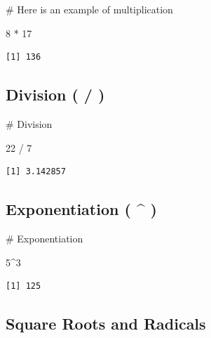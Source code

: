 \documentclass[
  letterpaper,
  DIV=11,
  numbers=noendperiod]{scrreprt}
\newenvironment{Shaded}{\begin{snugshade}}{\end{snugshade}}
\newcommand{\CommentTok}[1]{\textcolor[rgb]{0.37,0.37,0.37}{#1}}
\newcommand{\DecValTok}[1]{\textcolor[rgb]{0.68,0.00,0.00}{#1}}
\newcommand{\SpecialCharTok}[1]{\textcolor[rgb]{0.37,0.37,0.37}{#1}}
\begin{document}
\begin{Shaded}
\begin{Highlighting}[]
\CommentTok{\# Here is an example of multiplication}

\DecValTok{8} \SpecialCharTok{*} \DecValTok{17}
\end{Highlighting}
\end{Shaded}

\begin{verbatim}
[1] 136
\end{verbatim}

\subsection*{Division ( / )}\label{division}

\begin{Shaded}
\begin{Highlighting}[]
\CommentTok{\# Division}

\DecValTok{22} \SpecialCharTok{/} \DecValTok{7}
\end{Highlighting}
\end{Shaded}

\begin{verbatim}
[1] 3.142857
\end{verbatim}

\subsection*{Exponentiation ( \^{} )}\label{exponentiation}

\begin{Shaded}
\begin{Highlighting}[]
\CommentTok{\# Exponentiation}

\DecValTok{5}\SpecialCharTok{\^{}}\DecValTok{3}
\end{Highlighting}
\end{Shaded}

\begin{verbatim}
[1] 125
\end{verbatim}

\subsection*{Square Roots and Radicals}\label{square-roots-and-radicals}
\end{document}
